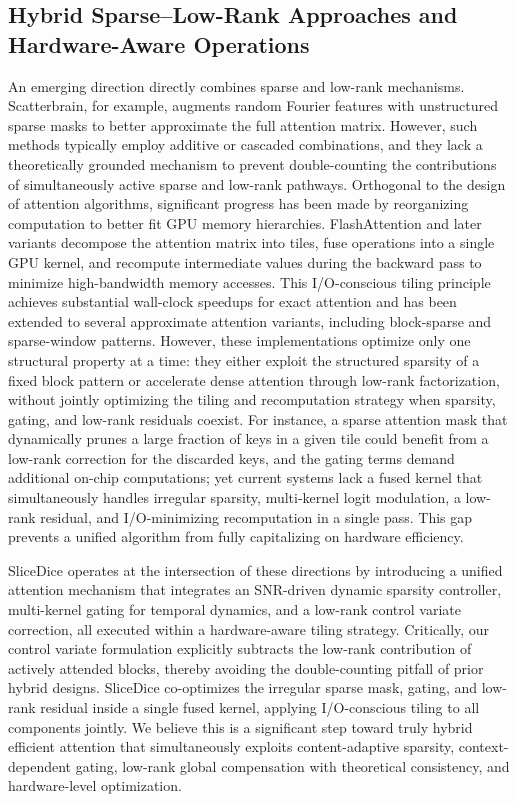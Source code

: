\documentclass{article}
\begin{document}
\subsection{Hybrid Sparse--Low-Rank Approaches and Hardware-Aware Operations}

An emerging direction directly combines sparse and low-rank mechanisms. Scatterbrain, for example, augments random Fourier features with unstructured sparse masks to better approximate the full attention matrix. However, such methods typically employ additive or cascaded combinations, and they lack a theoretically grounded mechanism to prevent double-counting the contributions of simultaneously active sparse and low-rank pathways. Orthogonal to the design of attention algorithms, significant progress has been made by reorganizing computation to better fit GPU memory hierarchies. FlashAttention and later variants decompose the attention matrix into tiles, fuse operations into a single GPU kernel, and recompute intermediate values during the backward pass to minimize high-bandwidth memory accesses. This I/O-conscious tiling principle achieves substantial wall-clock speedups for exact attention and has been extended to several approximate attention variants, including block-sparse and sparse-window patterns. However, these implementations optimize only one structural property at a time: they either exploit the structured sparsity of a fixed block pattern or accelerate dense attention through low-rank factorization, without jointly optimizing the tiling and recomputation strategy when sparsity, gating, and low-rank residuals coexist. For instance, a sparse attention mask that dynamically prunes a large fraction of keys in a given tile could benefit from a low-rank correction for the discarded keys, and the gating terms demand additional on-chip computations; yet current systems lack a fused kernel that simultaneously handles irregular sparsity, multi-kernel logit modulation, a low-rank residual, and I/O-minimizing recomputation in a single pass. This gap prevents a unified algorithm from fully capitalizing on hardware efficiency.

SliceDice operates at the intersection of these directions by introducing a unified attention mechanism that integrates an SNR-driven dynamic sparsity controller, multi-kernel gating for temporal dynamics, and a low-rank control variate correction, all executed within a hardware-aware tiling strategy. Critically, our control variate formulation explicitly subtracts the low-rank contribution of actively attended blocks, thereby avoiding the double-counting pitfall of prior hybrid designs. SliceDice co-optimizes the irregular sparse mask, gating, and low-rank residual inside a single fused kernel, applying I/O-conscious tiling to all components jointly. We believe this is a significant step toward truly hybrid efficient attention that simultaneously exploits content-adaptive sparsity, context-dependent gating, low-rank global compensation with theoretical consistency, and hardware-level optimization.
\end{document}
